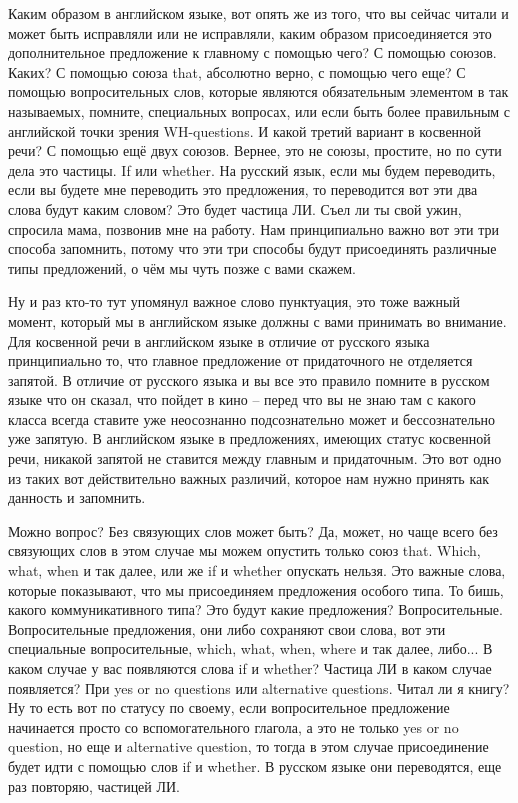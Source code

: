 \documentclass[main.tex]{subfiles}
\begin{document}
Каким образом в английском языке, вот опять же из того, что вы сейчас читали и может быть исправляли или не исправляли, каким образом присоединяется это дополнительное предложение к главному с помощью чего?
С помощью союзов.
Каких?
С помощью союза that, абсолютно верно, с помощью чего еще?
С помощью вопросительных слов, которые являются обязательным элементом в так называемых, помните, специальных вопросах, или если быть более правильным с английской точки зрения WH-questions.
И какой третий вариант в косвенной речи?
С помощью ещё двух союзов.
Вернее, это не союзы, простите, но по сути дела это частицы.
If или whether.
На русский язык, если мы будем переводить, если вы будете мне переводить это предложения, то переводится вот эти два слова будут каким словом?
Это будет частица ЛИ.
Съел ли ты свой ужин, спросила мама, позвонив мне на работу.
Нам принципиально важно вот эти три способа запомнить, потому что эти три способы будут присоединять различные типы предложений, о чём мы чуть позже с вами скажем.

Ну и раз кто-то тут упомянул важное слово пунктуация, это тоже важный момент, который мы в английском языке должны с вами принимать во внимание.
Для косвенной речи в английском языке в отличие от русского языка принципиально то, что главное предложение от придаточного не отделяется запятой.
В отличие от русского языка и вы все это правило помните в русском языке что он сказал, что пойдет в кино -- перед что вы не знаю там с какого класса всегда ставите уже неосознанно подсознательно может и бессознательно уже запятую.
В английском языке в предложениях, имеющих статус косвенной речи, никакой запятой не ставится между главным и придаточным.
Это вот одно из таких вот действительно важных различий, которое нам нужно принять как данность и запомнить.

Можно вопрос?
Без связующих слов может быть?
Да, может, но чаще всего без связующих слов в этом случае мы можем опустить только союз that.
Which, what, when и так далее, или же if и whether опускать нельзя.
Это важные слова, которые показывают, что мы присоединяем предложения особого типа.
То бишь, какого коммуникативного типа?
Это будут какие предложения?
Вопросительные.
Вопросительные предложения, они либо сохраняют свои слова, вот эти специальные вопросительные, which, what, when, where и так далее, либо...
В каком случае у вас появляются слова if и whether?
Частица ЛИ в каком случае появляется? 
При yes or no questions или alternative questions.
Читал ли я книгу?
Ну то есть вот по статусу по своему, если вопросительное предложение начинается просто со вспомогательного глагола, а это не только yes or no question, но еще и alternative question, то тогда в этом случае присоединение будет идти с помощью слов if и whether.
В русском языке они переводятся, еще раз повторяю, частицей ЛИ.
\end{document}
